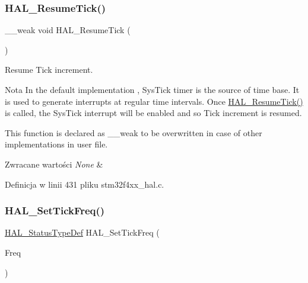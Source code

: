\subsubsection{\texorpdfstring{H\+A\+L\+\_\+\+Resume\+Tick()}{HAL\_ResumeTick()}}
{\footnotesize\ttfamily \+\_\+\+\_\+weak void H\+A\+L\+\_\+\+Resume\+Tick (\begin{DoxyParamCaption}\item[{void}]{ }\end{DoxyParamCaption})}



Resume Tick increment. 

\begin{DoxyNote}{Nota}
In the default implementation , Sys\+Tick timer is the source of time base. It is used to generate interrupts at regular time intervals. Once \hyperlink{group___h_a_l___exported___functions___group2_gac3fa17aa85e357e3f1af56ad110d2e97}{H\+A\+L\+\_\+\+Resume\+Tick()} is called, the Sys\+Tick interrupt will be enabled and so Tick increment is resumed. 

This function is declared as \+\_\+\+\_\+weak to be overwritten in case of other implementations in user file. 
\end{DoxyNote}

\begin{DoxyRetVals}{Zwracane wartości}
{\em None} & \\
\hline
\end{DoxyRetVals}


Definicja w linii 431 pliku stm32f4xx\+\_\+hal.\+c.

\mbox{\label{group___h_a_l___exported___functions___group2_ga47f2dd240b2aed823a76b11496f37690}} 
\subsubsection{\texorpdfstring{H\+A\+L\+\_\+\+Set\+Tick\+Freq()}{HAL\_SetTickFreq()}}
{\footnotesize\ttfamily \hyperlink{stm32f4xx__hal__def_8h_a63c0679d1cb8b8c684fbb0632743478f}{H\+A\+L\+\_\+\+Status\+Type\+Def} H\+A\+L\+\_\+\+Set\+Tick\+Freq (\begin{DoxyParamCaption}\item[{\hyperlink{group___h_a_l___t_i_c_k___f_r_e_q_gab36ec81674817249c46734772ff3b73a}{H\+A\+L\+\_\+\+Tick\+Freq\+Type\+Def}}]{Freq }\end{DoxyParamCaption})}



